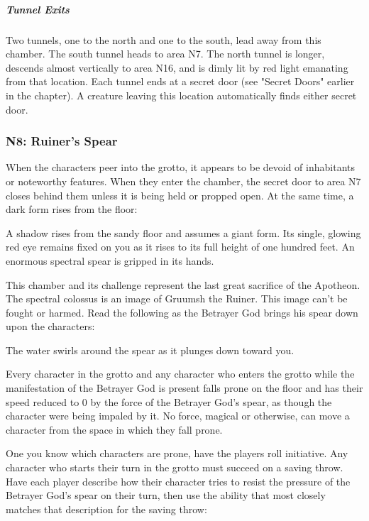 \documentclass[10pt,a4paper,twoside,bg=print,twocolumn,openany,nodeprecatedcode]{dndbook}
\begin{document}
\subparagraph{Tunnel Exits}
Two tunnels, one to the north and one to the south, lead away from this chamber. The south tunnel heads to area N7. The north tunnel is longer, descends almost vertically to area N16, and is dimly lit by red light emanating from that location. Each tunnel ends at a secret door (see "Secret Doors" earlier in the chapter). A creature leaving this location automatically finds either secret door.

\subsubsection{N8: Ruiner's Spear}
When the characters peer into the grotto, it appears to be devoid of inhabitants or noteworthy features. When they enter the chamber, the secret door to area N7 closes behind them unless it is being held or propped open. At the same time, a dark form rises from the floor:

\begin{DndReadAloud}{}
A shadow rises from the sandy floor and assumes a giant form. Its single, glowing red eye remains fixed on you as it rises to its full height of one hundred feet. An enormous spectral spear is gripped in its hands.

\end{DndReadAloud}

This chamber and its challenge represent the last great sacrifice of the Apotheon. The spectral colossus is an image of Gruumsh the Ruiner. This image can't be fought or harmed. Read the following as the Betrayer God brings his spear down upon the characters:

\begin{DndReadAloud}{}
The water swirls around the spear as it plunges down toward you.

\end{DndReadAloud}

Every character in the grotto and any character who enters the grotto while the manifestation of the Betrayer God is present falls prone on the floor and has their speed reduced to 0 by the force of the Betrayer God's spear, as though the character were being impaled by it. No force, magical or otherwise, can move a character from the space in which they fall prone.

One you know which characters are prone, have the players roll initiative. Any character who starts their turn in the grotto must succeed on a saving throw. Have each player describe how their character tries to resist the pressure of the Betrayer God's spear on their turn, then use the ability that most closely matches that description for the saving throw:
\end{document}
